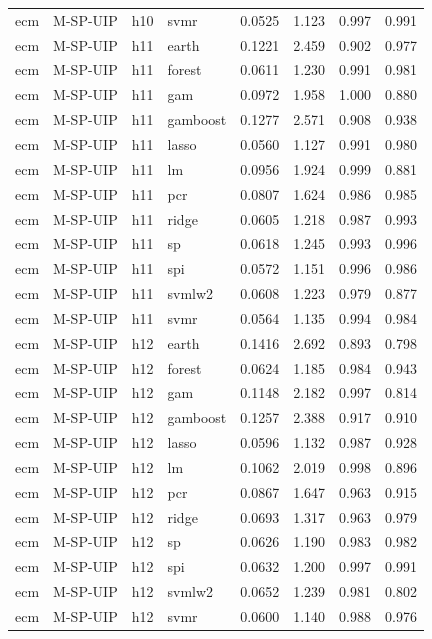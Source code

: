\begin{ThreePartTable}
\begin{longtable}[t]{llclcccc}
ecm & M-SP-UIP & h10 & svmr & 0.0525 & 1.123 & 0.997 & 0.991\\
\addlinespace
ecm & M-SP-UIP & h11 & earth & 0.1221 & 2.459 & 0.902 & 0.977\\
ecm & M-SP-UIP & h11 & forest & 0.0611 & 1.230 & 0.991 & 0.981\\
ecm & M-SP-UIP & h11 & gam & 0.0972 & 1.958 & 1.000 & 0.880\\
ecm & M-SP-UIP & h11 & gamboost & 0.1277 & 2.571 & 0.908 & 0.938\\
ecm & M-SP-UIP & h11 & lasso & 0.0560 & 1.127 & 0.991 & 0.980\\
ecm & M-SP-UIP & h11 & lm & 0.0956 & 1.924 & 0.999 & 0.881\\
ecm & M-SP-UIP & h11 & pcr & 0.0807 & 1.624 & 0.986 & 0.985\\
ecm & M-SP-UIP & h11 & ridge & 0.0605 & 1.218 & 0.987 & 0.993\\
ecm & M-SP-UIP & h11 & sp & 0.0618 & 1.245 & 0.993 & 0.996\\
ecm & M-SP-UIP & h11 & spi & 0.0572 & 1.151 & 0.996 & 0.986\\
ecm & M-SP-UIP & h11 & svmlw2 & 0.0608 & 1.223 & 0.979 & 0.877\\
ecm & M-SP-UIP & h11 & svmr & 0.0564 & 1.135 & 0.994 & 0.984\\
\addlinespace
ecm & M-SP-UIP & h12 & earth & 0.1416 & 2.692 & 0.893 & 0.798\\
ecm & M-SP-UIP & h12 & forest & 0.0624 & 1.185 & 0.984 & 0.943\\
ecm & M-SP-UIP & h12 & gam & 0.1148 & 2.182 & 0.997 & 0.814\\
ecm & M-SP-UIP & h12 & gamboost & 0.1257 & 2.388 & 0.917 & 0.910\\
ecm & M-SP-UIP & h12 & lasso & 0.0596 & 1.132 & 0.987 & 0.928\\
ecm & M-SP-UIP & h12 & lm & 0.1062 & 2.019 & 0.998 & 0.896\\
ecm & M-SP-UIP & h12 & pcr & 0.0867 & 1.647 & 0.963 & 0.915\\
ecm & M-SP-UIP & h12 & ridge & 0.0693 & 1.317 & 0.963 & 0.979\\
ecm & M-SP-UIP & h12 & sp & 0.0626 & 1.190 & 0.983 & 0.982\\
ecm & M-SP-UIP & h12 & spi & 0.0632 & 1.200 & 0.997 & 0.991\\
ecm & M-SP-UIP & h12 & svmlw2 & 0.0652 & 1.239 & 0.981 & 0.802\\
ecm & M-SP-UIP & h12 & svmr & 0.0600 & 1.140 & 0.988 & 0.976\\

\end{longtable}
\end{ThreePartTable}
